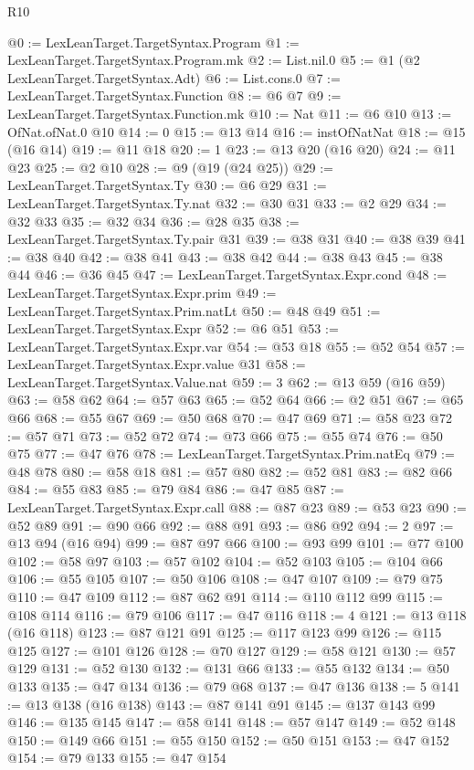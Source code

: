\begin{lexlean}{R10}
\begin{coremodule}
@0 := LexLeanTarget.TargetSyntax.Program
@1 := LexLeanTarget.TargetSyntax.Program.mk
@2 := List.nil.{0}
@5 := @1 (@2 LexLeanTarget.TargetSyntax.Adt)
@6 := List.cons.{0}
@7 := LexLeanTarget.TargetSyntax.Function
@8 := @6 @7
@9 := LexLeanTarget.TargetSyntax.Function.mk
@10 := Nat
@11 := @6 @10
@13 := OfNat.ofNat.{0} @10
@14 := 0
@15 := @13 @14
@16 := instOfNatNat
@18 := @15 (@16 @14)
@19 := @11 @18
@20 := 1
@23 := @13 @20 (@16 @20)
@24 := @11 @23
@25 := @2 @10
@28 := @9 (@19 (@24 @25))
@29 := LexLeanTarget.TargetSyntax.Ty
@30 := @6 @29
@31 := LexLeanTarget.TargetSyntax.Ty.nat
@32 := @30 @31
@33 := @2 @29
@34 := @32 @33
@35 := @32 @34
@36 := @28 @35
@38 := LexLeanTarget.TargetSyntax.Ty.pair @31
@39 := @38 @31
@40 := @38 @39
@41 := @38 @40
@42 := @38 @41
@43 := @38 @42
@44 := @38 @43
@45 := @38 @44
@46 := @36 @45
@47 := LexLeanTarget.TargetSyntax.Expr.cond
@48 := LexLeanTarget.TargetSyntax.Expr.prim
@49 := LexLeanTarget.TargetSyntax.Prim.natLt
@50 := @48 @49
@51 := LexLeanTarget.TargetSyntax.Expr
@52 := @6 @51
@53 := LexLeanTarget.TargetSyntax.Expr.var
@54 := @53 @18
@55 := @52 @54
@57 := LexLeanTarget.TargetSyntax.Expr.value @31
@58 := LexLeanTarget.TargetSyntax.Value.nat
@59 := 3
@62 := @13 @59 (@16 @59)
@63 := @58 @62
@64 := @57 @63
@65 := @52 @64
@66 := @2 @51
@67 := @65 @66
@68 := @55 @67
@69 := @50 @68
@70 := @47 @69
@71 := @58 @23
@72 := @57 @71
@73 := @52 @72
@74 := @73 @66
@75 := @55 @74
@76 := @50 @75
@77 := @47 @76
@78 := LexLeanTarget.TargetSyntax.Prim.natEq
@79 := @48 @78
@80 := @58 @18
@81 := @57 @80
@82 := @52 @81
@83 := @82 @66
@84 := @55 @83
@85 := @79 @84
@86 := @47 @85
@87 := LexLeanTarget.TargetSyntax.Expr.call
@88 := @87 @23
@89 := @53 @23
@90 := @52 @89
@91 := @90 @66
@92 := @88 @91
@93 := @86 @92
@94 := 2
@97 := @13 @94 (@16 @94)
@99 := @87 @97 @66
@100 := @93 @99
@101 := @77 @100
@102 := @58 @97
@103 := @57 @102
@104 := @52 @103
@105 := @104 @66
@106 := @55 @105
@107 := @50 @106
@108 := @47 @107
@109 := @79 @75
@110 := @47 @109
@112 := @87 @62 @91
@114 := @110 @112 @99
@115 := @108 @114
@116 := @79 @106
@117 := @47 @116
@118 := 4
@121 := @13 @118 (@16 @118)
@123 := @87 @121 @91
@125 := @117 @123 @99
@126 := @115 @125
@127 := @101 @126
@128 := @70 @127
@129 := @58 @121
@130 := @57 @129
@131 := @52 @130
@132 := @131 @66
@133 := @55 @132
@134 := @50 @133
@135 := @47 @134
@136 := @79 @68
@137 := @47 @136
@138 := 5
@141 := @13 @138 (@16 @138)
@143 := @87 @141 @91
@145 := @137 @143 @99
@146 := @135 @145
@147 := @58 @141
@148 := @57 @147
@149 := @52 @148
@150 := @149 @66
@151 := @55 @150
@152 := @50 @151
@153 := @47 @152
@154 := @79 @133
@155 := @47 @154

\end{coremodule}
\end{lexlean}
